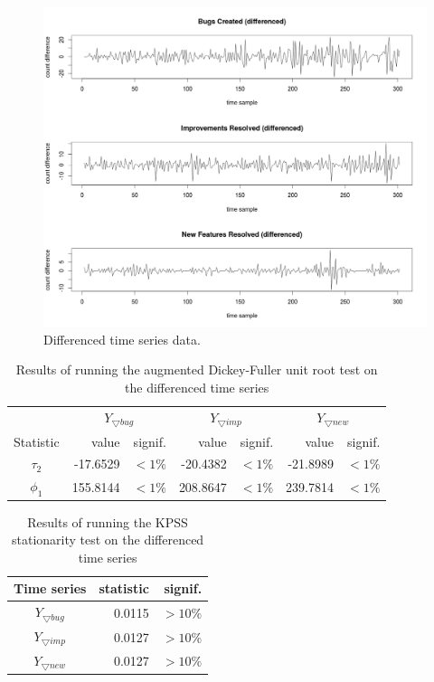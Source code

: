 \documentclass[a4paper]{scrartcl}
\begin{document}
\begin{figure}[htbp!]
\begin{center}
\includegraphics[width=\textwidth]{images/time_series_diff}
\caption{Differenced time series data.}
\label{fig:differenced_time_series}
\end{center}
\end{figure}

\begin{table}[h!]
  \centering
  \begin{tabular}{ c | r r | r r | r r }
      & \multicolumn{2}{|c|}{$Y_{\bigtriangledown bug}$} & \multicolumn{2}{|c|}{$Y_{\bigtriangledown imp}$} & \multicolumn{2}{|c}{$Y_{\bigtriangledown new}$} \\
    Statistic & value & signif. & value & signif. & value & signif. \\
    \hline
    $\tau_2$ & -17.6529 & $< 1\%$ & -20.4382 & $< 1\%$ & -21.8989 & $< 1\%$ \\
    $\phi_1$ & 155.8144 & $< 1\%$ & 208.8647 & $< 1\%$ & 239.7814 & $< 1\%$ \\
    \hline
  \end{tabular}
\caption{Results of running the augmented Dickey-Fuller unit root test on the differenced time series}
\label{tab:first_diff_unit_root_results}
\end{table}

\begin{table}[h!]
  \centering
  \begin{tabular}{ c | r r }
    Time series & statistic & signif. \\
    \hline
    $Y_{\bigtriangledown bug}$ & 0.0115 & $> 10\%$ \\
    $Y_{\bigtriangledown imp}$ & 0.0127 & $> 10\%$ \\
    $Y_{\bigtriangledown new}$ & 0.0127 & $> 10\%$ \\
    \hline
  \end{tabular}
\caption{Results of running the KPSS stationarity test on the differenced time series}
\label{tab:first_diff_stationarity_results}
\end{table}
\end{document}
